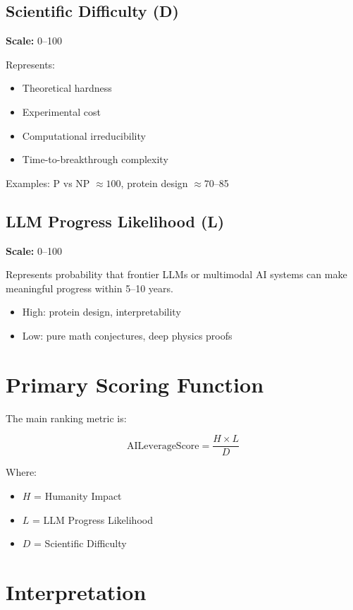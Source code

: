 \documentclass[11pt]{article}
\begin{document}
\subsection{Scientific Difficulty (D)}
\textbf{Scale:} 0--100

Represents:
\begin{itemize}
    \item Theoretical hardness
    \item Experimental cost
    \item Computational irreducibility
    \item Time-to-breakthrough complexity
\end{itemize}

Examples:
P vs NP $\approx 100$, protein design $\approx 70$--85

\subsection{LLM Progress Likelihood (L)}
\textbf{Scale:} 0--100

Represents probability that frontier LLMs or multimodal AI systems can make meaningful progress within 5--10 years.

\begin{itemize}
    \item High: protein design, interpretability
    \item Low: pure math conjectures, deep physics proofs
\end{itemize}

\section{Primary Scoring Function}

The main ranking metric is:

\begin{equation}
\text{AILeverageScore} = \frac{H \times L}{D}
\end{equation}

Where:
\begin{itemize}
    \item $H$ = Humanity Impact
    \item $L$ = LLM Progress Likelihood
    \item $D$ = Scientific Difficulty
\end{itemize}

\section{Interpretation}
\end{document}
